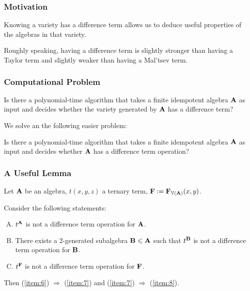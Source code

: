 \documentclass[12pt,xcolor=dvipsnames%
   ]{beamer}
\begin{document}
\begin{frame}
  \frametitle{Motivation}
  Knowing a variety has a difference term allows us to deduce useful
  properties of the algebras in that variety.

  Roughly speaking, having a difference term is slightly stronger than having
  a Taylor term and slightly weaker than having a Mal'tsev term.
\end{frame}

\begin{frame}
  \frametitle{Computational Problem}
  \begin{problem}[1]
  \label{prob:1}
  Is there a polynomial-time algorithm that takes a finite
  idempotent algebra $\mathbf{A}$ as input and decides whether the variety generated by
  $\mathbf{A}$ has a difference term?
\end{problem}

We solve an the following easier problem:
\begin{problem}[2]
  \label{prob:2}
  Is there a polynomial-time algorithm that takes a finite
  idempotent algebra $\mathbf{A}$ as input and decides whether 
  $\mathbf{A}$ has a difference term operation?
\end{problem}
\end{frame}

\begin{frame}
  \frametitle{A Useful Lemma}
  
\begin{lemma}
  \label{lem:equiv-cond-exist-1}
  Let $\mathbf{A}$ be an algebra, $t(x,y,z)$ a ternary term,
  $\mathbf{F} := \mathbf{F}_{\operatorname{\mathbb{V}}(\mathbf{A})}(x,y)$. 

  Consider the following statements:
  \begin{enumerate}[(A)]
  \item \label{item:6} $t^{\mathbf{A}}$ is not a difference term operation for $\mathbf{A}$.
  \item \label{item:7} There exists a 2-generated subalgebra $\mathbf{B} \leqslant \mathbf{A}$
    such that $t^{\mathbf{B}}$ is not a difference term operation for $\mathbf{B}$.
  \item \label{item:8} $t^{\mathbf{F}}$ is not a difference term operation for $\mathbf{F}$.
  \end{enumerate}
  Then (\ref{item:6}) $\Rightarrow$ (\ref{item:7}) and (\ref{item:7})  $\Rightarrow$ (\ref{item:8}).
\end{lemma}
\end{frame}
\end{document}
